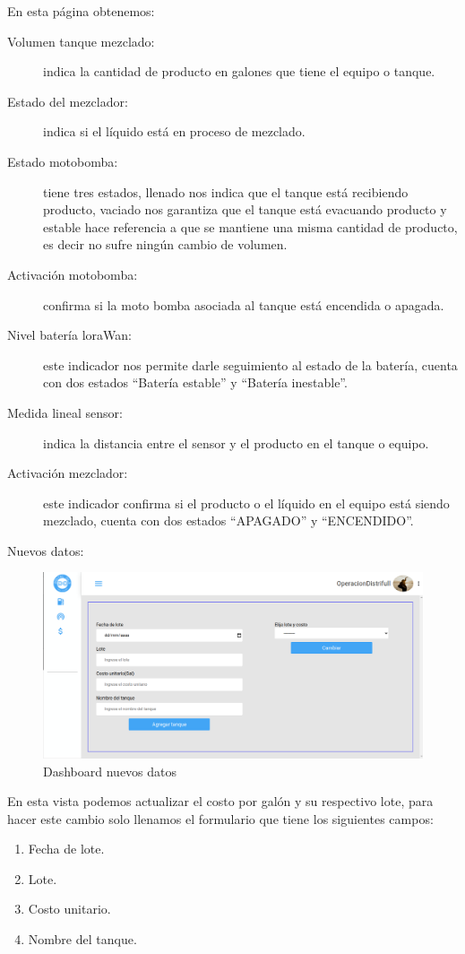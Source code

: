 En esta p\'agina obtenemos: 
\begin{description}
	\item[Volumen tanque mezclado: ] indica la cantidad de producto en galones que tiene el equipo o tanque.
	\item[Estado del mezclador: ] indica si el l\'iquido est\'a en proceso de mezclado.
	\item[Estado motobomba: ] tiene tres estados, llenado nos indica que el tanque est\'a recibiendo producto, vaciado nos garantiza que el tanque est\'a evacuando producto y estable hace referencia a que se mantiene una misma cantidad de producto, es decir no sufre ning\'un cambio de volumen.
	\item[Activaci\'on motobomba: ] confirma si la moto bomba asociada al tanque est\'a encendida o apagada.
	\item[Nivel bater\'ia loraWan: ] este indicador nos permite darle seguimiento al estado de la bater\'ia, cuenta con dos estados ``Bater\'ia estable'' y ``Bater\'ia inestable''. 
	\item[Medida lineal sensor: ] indica la distancia entre el sensor y el producto en el tanque o equipo.
	\item[Activaci\'on mezclador: ] este indicador confirma si el producto o el l\'iquido en el equipo est\'a siendo mezclado, cuenta con dos estados ``APAGADO'' y ``ENCENDIDO''.
\end{description}
\newpage
Nuevos datos: 
\begin{figure}[h!]
	\centering
	\includegraphics[width=1\linewidth, height=0.4\textheight]{imagenes/dashboardEstadistica}
	\caption[Dashboard nuevos datos.]{Dashboard nuevos datos}
	\label{fig:dashboardEstadistica}
\end{figure}

En esta vista podemos actualizar el costo por gal\'on y su respectivo lote, para hacer este cambio solo llenamos el formulario que tiene los siguientes campos: 
\begin{enumerate}[{\rm 1.}]
	\item Fecha de lote.
	\item Lote.
	\item Costo unitario.
	\item Nombre del tanque.
\end{enumerate}

